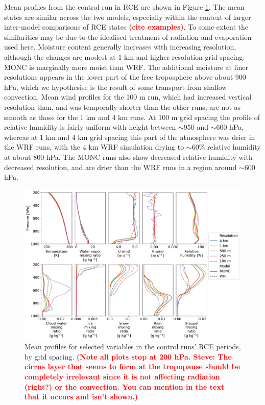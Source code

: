 \documentclass[draft]{agujournal2019}
\newcommand{\todo}[1]{\textcolor{red}{\textbf{(#1)}}}
\begin{document}
Mean profiles from the control run in RCE are shown in Figure
\ref{fig:rce_profiles}. The mean states are similar across the two models,
especially within the context of larger inter-model comparisons of RCE states
\todo{cite examples}. To some extent the similarities may be due to the
idealised treatment of radiation and evaporation used here. Moisture content
generally increases with increasing resolution, although the changes are modest
at 1 km and higher-resolution grid spacing. MONC is marginally more moist than
WRF. The additional moisture at finer resolutions appears in the lower part of
the free troposphere above about 900 hPa, which we hypothesise is the result of
some transport from shallow convection. Mean wind profiles for the 100 m run,
which had increased vertical resolution than, and was temporally shorter than
the other runs, are not as smooth as those for the 1 km and 4 km runs. At 100 m
grid spacing the profile of relative humidity is fairly uniform with height
between $\sim$950 and $\sim$600 hPa, whereas at 1 km and 4 km grid spacing this
part of the atmosphere was drier in the WRF runs, with the 4 km WRF simulation
drying to $\sim$60\% relative humidity at about 800 hPa. The MONC runs also show
decreased relative humidity with decreased resolution, and are drier than the
WRF runs in a region around $\sim$600 hPa.

\begin{figure}[pth]
    \noindent\includegraphics[width=\textwidth]{figures/rce_profiles}
    \caption{Mean profiles for selected variables in the control runs' RCE
    periods, by grid spacing. \todo{Note all plots stop at 200 hPa. Steve: The
    cirrus layer that seems to form at the tropopause should be completely
    irrelevant since it is not affecting radiation (right?) or the convection.
    You can mention in the text that it occurs and isn’t shown.}}
    \label{fig:rce_profiles}
\end{figure}
\end{document}
